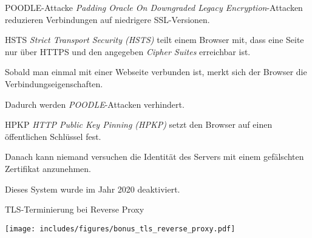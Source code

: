 \begin{bonus}{POODLE-Attacke}
    \emph{Padding Oracle On Downgraded Legacy Encryption}-Attacken reduzieren Verbindungen auf niedrigere SSL-Versionen.
\end{bonus}

\begin{defi}{HSTS}
    \emph{Strict Transport Security (HSTS)} teilt einem Browser mit, dass eine Seite nur über HTTPS und den angegeben \emph{Cipher Suites} erreichbar ist.

    Sobald man einmal mit einer Webseite verbunden ist, merkt sich der Browser die Verbindungseigenschaften.

    Dadurch werden \emph{POODLE}-Attacken verhindert.
\end{defi}

\begin{defi}{HPKP}
    \emph{HTTP Public Key Pinning (HPKP)} setzt den Browser auf einen öffentlichen Schlüssel fest.

    Danach kann niemand versuchen die Identität des Servers mit einem gefälschten Zertifikat anzunehmen.

    Dieses System wurde im Jahr 2020 deaktiviert.
\end{defi}

\begin{bonus}{TLS-Terminierung bei Reverse Proxy}
    \begin{center}
        \texttt{[image: includes/figures/bonus\_tls\_reverse\_proxy.pdf]}
    \end{center}
\end{bonus}